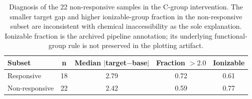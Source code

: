 \begin{table}[t]
\centering
\caption{Diagnosis of the 22 non-responsive samples in the C-group intervention. The smaller target gap and higher ionizable-group fraction in the non-responsive subset are inconsistent with chemical inaccessibility as the sole explanation. Ionizable fraction is the archived pipeline annotation; its underlying functional-group rule is not preserved in the plotting artifact.}
\label{tab:nonresponse}
\begin{tabular}{lcccc}
\toprule
Subset & n & Median $|$target$-$base$|$ & Fraction $>2.0$ & Ionizable \\
\midrule
Responsive & 18 & 2.79 & 0.72 & 0.61 \\
Non-responsive & 22 & 2.42 & 0.59 & 0.77 \\
\bottomrule
\end{tabular}
\end{table}
